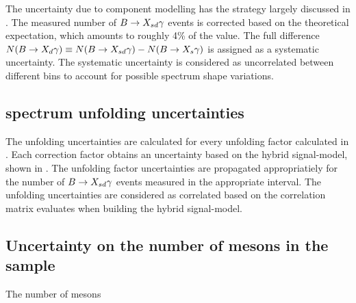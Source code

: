 The uncertainty due to \BtoXdgamma component modelling has the strategy largely discussed in .
The measured number of $\BtoXsdgamma$ events is corrected based on the theoretical \BtoXdgamma expectation, which amounts to roughly 4\% of the value.
The full difference $N(\BtoXdgamma) \equiv N(\BtoXsdgamma)-N(\BtoXsgamma)$ is assigned as a systematic uncertainty.
The systematic uncertainty is considered as uncorrelated between different \EB bins to account for possible spectrum shape variations.

\subsection{\texorpdfstring{\EB}{EB} spectrum unfolding uncertainties}\label{sec:unfolding_systematic}

The unfolding uncertainties are calculated for every unfolding factor calculated in .
Each correction factor obtains an uncertainty based on the hybrid signal-model, shown in .
The unfolding factor uncertainties are propagated appropriatiely for the number of $\BtoXsdgamma$ events measured in the appropriate \EB interval.
The unfolding uncertainties are considered as correlated based on the correlation matrix evaluates when building the hybrid signal-model.

\subsection{Uncertainty on the number of \texorpdfstring{\B}{B} mesons in the sample}\label{sec:b_meson_uncertainty}

The number of \B mesons 
